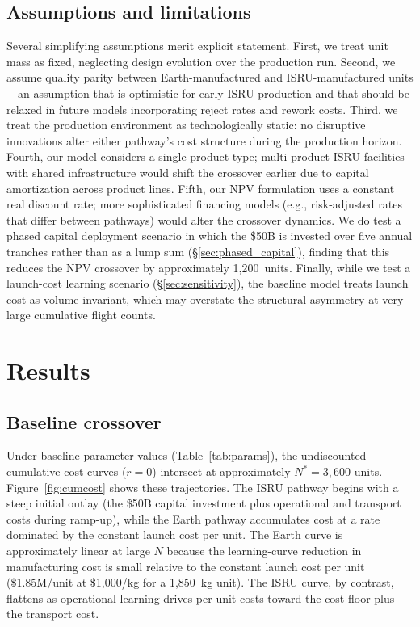 \documentclass[preprint,12pt]{elsarticle}
\begin{document}
\subsection{Assumptions and limitations}

Several simplifying assumptions merit explicit statement. First, we treat unit mass as fixed, neglecting design evolution over the production run. Second, we assume quality parity between Earth-manufactured and ISRU-manufactured units---an assumption that is optimistic for early ISRU production and that should be relaxed in future models incorporating reject rates and rework costs. Third, we treat the production environment as technologically static: no disruptive innovations alter either pathway's cost structure during the production horizon. Fourth, our model considers a single product type; multi-product ISRU facilities with shared infrastructure would shift the crossover earlier due to capital amortization across product lines. Fifth, our NPV formulation uses a constant real discount rate; more sophisticated financing models (e.g., risk-adjusted rates that differ between pathways) would alter the crossover dynamics. We do test a phased capital deployment scenario in which the \$50B is invested over five annual tranches rather than as a lump sum (\S\ref{sec:phased_capital}), finding that this reduces the NPV crossover by approximately 1{,}200~units. Finally, while we test a launch-cost learning scenario (\S\ref{sec:sensitivity}), the baseline model treats launch cost as volume-invariant, which may overstate the structural asymmetry at very large cumulative flight counts.

\section{Results}
\label{sec:results}

\subsection{Baseline crossover}

Under baseline parameter values (Table~\ref{tab:params}), the undiscounted cumulative cost curves ($r = 0$) intersect at approximately $N^* = 3{,}600$ units. Figure~\ref{fig:cumcost} shows these trajectories. The ISRU pathway begins with a steep initial outlay (the \$50B capital investment plus operational and transport costs during ramp-up), while the Earth pathway accumulates cost at a rate dominated by the constant launch cost per unit. The Earth curve is approximately linear at large $N$ because the learning-curve reduction in manufacturing cost is small relative to the constant launch cost per unit (\$1.85M/unit at \$1{,}000/kg for a 1{,}850~kg unit). The ISRU curve, by contrast, flattens as operational learning drives per-unit costs toward the cost floor plus the transport cost.
\end{document}
